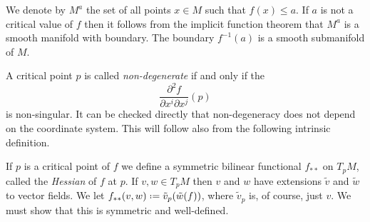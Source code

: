 We denote by \(M^a\) the set of all points \(x\in M\) such that \(f(x)\leq
a\). If \(a\) is not a critical value of \(f\) then it follows from the
implicit function theorem that \(M^a\) is a smooth manifold with
boundary. The boundary \(f^{-1}(a)\) is a smooth submanifold of \(M\).

A critical point \(p\) is called \emph{non-degenerate} if and only if the
\[
  \frac{\partial^2 f}{\partial x^i\partial x^j}(p)
\]
is non-singular. It can be checked directly that non-degeneracy does not
depend on the coordinate system. This will follow also from the following
intrinsic definition.

If \(p\) is a critical point of \(f\) we define a symmetric bilinear
functional \(f_{**}\) on \(T_pM\), called the \emph{Hessian} of \(f\) at
\(p\). If \(v,w\in T_pM\) then \(v\) and \(w\) have extensions \(\tilde v\)
and \(\tilde w\) to vector fields. We let \(f_{**}(v,w)\defeq \tilde
v_p(\tilde w(f))\), where \(\tilde v_p\) is, of course, just
\(v\). We must show that this is symmetric and well-defined.

